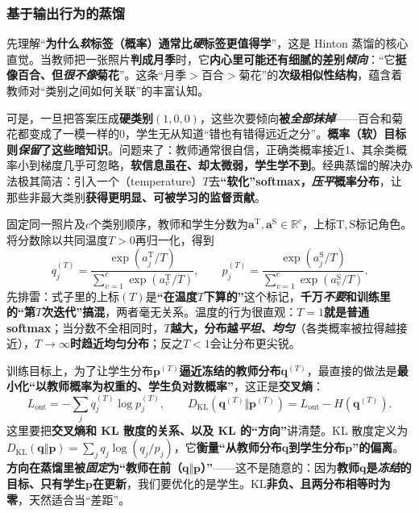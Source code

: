 \subsubsection{基于输出行为的蒸馏}
\label{sec:ket-integration-output-distillation}

先理解“\textbf{为什么\emph{软}标签（概率）通常比\emph{硬}标签更值得学}”，这是 Hinton 蒸馏的核心直觉。当教师把一张照片\textbf{判成月季}时，它\textbf{内心里可能还有细腻的差别\emph{倾向}}：“它\textbf{挺像百合、但\emph{很不像}菊花}”。这条“月季$>$百合$>$菊花”的\textbf{次级相似性结构}，蕴含着教师对“类别之间如何关联”的丰富认知。

可是，一旦把答案压成\textbf{硬类别}$(1,0,0)$，这些次要倾向\textbf{被\emph{全部抹掉}}——百合和菊花都变成了一模一样的$0$，学生无从知道“错也有错得远近之分”。\textbf{概率（软）目标则\emph{保留}了这些暗知识}。问题来了：教师通常很自信，正确类概率接近1、其余类概率小到梯度几乎可忽略，\textbf{软信息虽在、却太微弱，学生学不到}。经典蒸馏的解决办法极其简洁：引入一个（temperature）$T$去\textbf{“软化”softmax，\emph{压平}概率分布}，让那些非最大类别\textbf{获得更明显、可被学习的监督贡献}。

固定同一照片及$c$个类别顺序，教师和学生分数为$\bm{a}^{\mathrm{T}},\bm{a}^{\mathrm{S}}\in\mathbb{R}^{c}$，上标$\mathrm{T},\mathrm{S}$标记角色。将分数除以共同温度$T>0$再归一化，得到
\begin{equation}
  q_j^{(T)}=\frac{\exp(a_j^{\mathrm{T}}/T)}
                    {\sum_{v=1}^{c}\exp(a_v^{\mathrm{T}}/T)},\qquad
  p_j^{(T)}=\frac{\exp(a_j^{\mathrm{S}}/T)}
                    {\sum_{v=1}^{c}\exp(a_v^{\mathrm{S}}/T)}.
  \label{eq:ket-integration-temperature}
\end{equation}
先排雷：式子里的上标$(T)$是\textbf{“在温度$T$下算的”}这个标记，\textbf{千万\emph{不要}和训练里的“第$T$次迭代”搞混}，两者毫无关系。温度的行为很直观：\textbf{$T=1$就是普通softmax}；当分数不全相同时，\textbf{$T$越大，分布越\emph{平坦、均匀}}（各类概率被拉得越接近），\textbf{$T\to\infty$时趋近均匀分布}；反之$T<1$会让分布更尖锐。

训练目标上，为了让学生分布$\bm{p}^{(T)}$\textbf{逼近冻结的教师分布}$\bm{q}^{(T)}$，最直接的做法是\textbf{最小化“以教师概率为权重的、学生负对数概率”}，这正是\textbf{交叉熵}：
\begin{equation}
  L_{\mathrm{out}}
  =-\sum_j q_j^{(T)}\log p_j^{(T)},\qquad
  D_{\mathrm{KL}}(\bm{q}^{(T)}\Vert\bm{p}^{(T)})
  =L_{\mathrm{out}}-H(\bm{q}^{(T)}).
  \label{eq:ket-integration-output-loss}
\end{equation}
这里要把\textbf{交叉熵和 KL 散度的关系、以及 KL 的“方向”}讲清楚。KL 散度定义为$D_{\mathrm{KL}}(\bm{q}\Vert\bm{p})=\sum_jq_j\log(q_j/p_j)$，它\textbf{衡量“从教师分布$\bm{q}$到学生分布$\bm{p}$”的偏离}。\textbf{方向在蒸馏里被\emph{固定}为“教师在前（$\bm{q}\Vert\bm{p}$）”}——这不是随意的：因为\textbf{教师$\bm{q}$是\emph{冻结}的目标、只有学生$\bm{p}$在更新}，我们要优化的是学生。KL\textbf{非负、且两分布相等时为零}，天然适合当“差距”。

